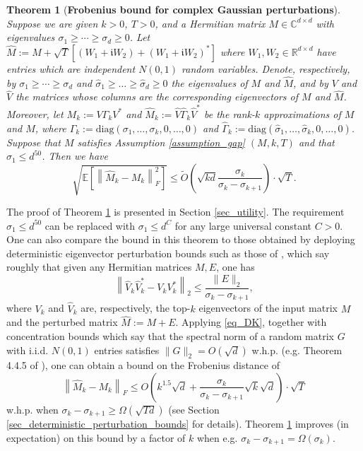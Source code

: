 \documentclass[11pt,letterpaper]{article}
\newtheorem{theorem}{Theorem}[section]
\begin{document}
\begin{theorem}[\bf Frobenius bound for complex Gaussian perturbations] \label{thm_rank_k_covariance_approximation_new}
Suppose we are given $k>0$, $T>0$, and a  Hermitian matrix  $M \in \mathbb{C}^{d \times d}$ with eigenvalues  $\sigma_1 \geq \cdots \geq \sigma_d \geq 0$.   
%
Let $\hat{M} := M + \sqrt{T}[(W_1 + \mathfrak{i}W_2) + (W_1 + \mathfrak{i}W_2)^\ast]$ where $W_1, W_2 \in \mathbb{R}^{d \times d}$ have entries which are independent $N(0,1)$ random variables.
%
 Denote, respectively, by  $\sigma_1 \geq \cdots \geq \sigma_d$ and  $\hat{\sigma}_1\geq \ldots \geq \hat{\sigma}_d \geq 0$ the eigenvalues of $M$ and $\hat{M}$, and by $V$ and  $\hat{V}$ the matrices whose columns are the corresponding eigenvectors of $M$ and $\hat{M}$.
%
Moreover, let  $M_k := V \Gamma_k V^\ast$ and  $\hat{M}_k := \hat{V} \hat{\Gamma}_k \hat{V}^\ast$ be the rank-$k$ approximations of $M$ and $\hat{M}$, where $\Gamma_k := \mathrm{diag}(\sigma_1,\ldots, \sigma_k,0,\ldots,0)$  and $\hat{\Gamma}_k := \mathrm{diag}(\hat{\sigma}_1,\ldots, \hat{\sigma}_k,0,\ldots,0)$. 
%
%
Suppose that $M$ satisfies Assumption \ref{assumption_gap} $(M, k, T)$ and that $\sigma_1 \leq d^{50}$. 
%
Then we have
$$ 
\sqrt{\mathbb{E}\left[\left\|\hat{M}_k -  M_k\right \|_F^2\right]} \leq \tilde{O}\left(\sqrt{kd} \frac{\sigma_k}{\sigma_k - \sigma_{k+1}}\right) \cdot \sqrt{T}.
$$
\end{theorem}
\noindent
 The proof of Theorem \ref{thm_rank_k_covariance_approximation_new} is presented in Section \ref{sec_utility}.
%
The requirement  $\sigma_1 \leq d^{50}$  can be replaced with $\sigma_1 \leq d^{C}$ for any large universal constant $C>0$.
%
One can also compare the bound in this theorem to those obtained by deploying deterministic eigenvector perturbation bounds such as those of \cite{davis1970rotation}, which say roughly that given any Hermitian matrices $M, E$, one has 
%
\begin{equation}\label{eq_DK}
\left\|\hat{V}_k\hat{V}_k^\ast - V_k V_k^\ast \right\|_2 \leq \frac{\|E\|_2}{\sigma_k - \sigma_{k+1}},
\end{equation}
%
where $V_k$ and $\hat{V}_k$ are, respectively, the top-$k$ eigenvectors of the input matrix $M$ and the perturbed matrix $\hat{M} := M+E$.
%
Applying \eqref{eq_DK}, together with concentration bounds which say that the spectral norm of a random matrix $G$ with i.i.d. $N(0,1)$ entries satisfies $\|G\|_2 = O(\sqrt{d})$ w.h.p. (e.g. Theorem 4.4.5 of \cite{vershynin2018high}), one can obtain a bound on the Frobenius distance of
%
$$\left\|\hat{M}_k - M_k\right\|_F \leq O\left(k^{1.5}\sqrt{d} + \frac{\sigma_k}{\sigma_{k}-\sigma_{k+1}} \sqrt{k}\sqrt{d}\right) \cdot \sqrt{T}$$ w.h.p. when  $\sigma_k-\sigma_{k+1} \geq \Omega(\sqrt{Td})$ (see Section \ref{sec_deterministic_perturbation_bounds} for details). 
%
Theorem \ref{thm_rank_k_covariance_approximation_new} improves (in expectation) on this bound by a factor of $k$ when e.g. $\sigma_k-\sigma_{k+1} = \Omega(\sigma_k)$.
\end{document}
